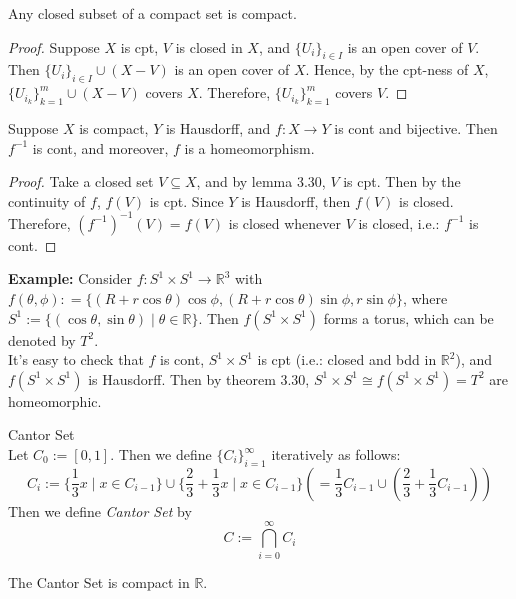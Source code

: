\begin{lemma}
    Any closed subset of a compact set is compact.
\end{lemma}

\begin{proof}
    Suppose $X$ is cpt, $V$ is closed in $X$, and $\{ U_i \}_{i\in I}$ is an open cover of $V$. Then $\{ U_i \}_{i\in I} \cup (X-V)$ is an open cover of $X$. Hence, by the cpt-ness of $X$, $\{ U_{i_k} \} _{k=1} ^m \cup (X-V)$ covers $X$. Therefore, $\{ U_{i_k} \} _{k=1} ^m $ covers $V$.
\end{proof}

\begin{theorem}
    Suppose $X$ is compact, $Y$ is Hausdorff, and $f: X\rightarrow Y$ is cont and bijective. Then $f^{-1}$ is cont, and moreover, $f$ is a homeomorphism.
\end{theorem}

\begin{proof}
    Take a closed set $V \subseteq X$, and by lemma 3.30, $V$ is cpt. Then by the continuity of $f$, $f(V)$ is cpt. Since $Y$ is Hausdorff, then $f(V)$ is closed. Therefore, $(f^{-1})^{-1}(V) = f(V)$ is closed whenever $V$ is closed, i.e.: $f^{-1}$ is cont.
\end{proof}

\noindent\textbf{Example:} Consider $f : S^1 \times S^1 \rightarrow \mathbb{R}^3$ with $f(\theta , \phi ) : = \{ (R + r\cos \theta) \cos \phi , (R + r\cos \theta) \sin \phi , r \sin \phi \}$, where $S ^1 := \{ (\cos\theta , \sin \theta) \mid \theta \in \mathbb{R} \}$. Then $f(S^1 \times S^1)$ forms a torus, which can be denoted by $T^2$.\\
It's easy to check that $f$ is cont, $ S^1 \times S^1$ is cpt (i.e.: closed and bdd in $\mathbb{R} ^2$), and $f( S^1 \times S^1)$ is Hausdorff. Then by theorem 3.30, $ S^1 \times S^1 \cong  f(S^1 \times S^1) = T^2$ are homeomorphic.

\begin{definition}{Cantor Set}\\
Let $C_0 := [0,1]$. Then we define $\{ C_i\}_{i=1}^\infty$ iteratively as follows:
$$C_i := \{ \frac{1}{3} x \mid x \in C_{i-1} \} \cup \{ \frac{2}{3} + \frac{1}{3} x \mid x \in C_{i-1} \} (= \frac{1}{3}C_{i-1} \cup (\frac{2}{3} + \frac{1}{3}C_{i-1}))$$
Then we define \textit{Cantor Set} by
$$C:= \bigcap _{i=0}^\infty C_{i}$$
\end{definition}

\begin{proposition}
    The Cantor Set is compact in $\mathbb{R}$.
\end{proposition}

